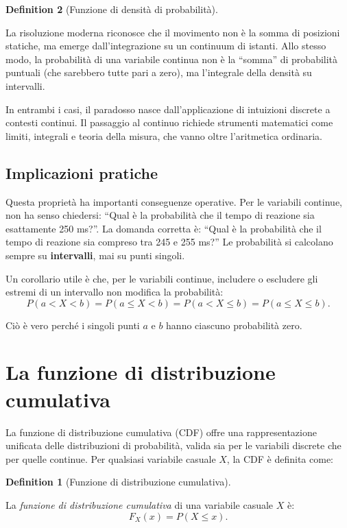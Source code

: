 \documentclass[
  letterpaper,
  DIV=11,
  numbers=noendperiod,
  oneside]{scrreprt}
\theoremstyle{definition}
\theoremstyle{plain}
\theoremstyle{definition}
\newtheorem{definition}{Definition}[chapter]
\theoremstyle{remark}
\begin{document}
\begin{definition}[Funzione di densità di
probabilità]
\begin{tcolorbox}
La risoluzione moderna riconosce che il movimento non è la somma di
posizioni statiche, ma emerge dall'integrazione su un continuum di
istanti. Allo stesso modo, la probabilità di una variabile continua non
è la ``somma'' di probabilità puntuali (che sarebbero tutte pari a
zero), ma l'integrale della densità su intervalli.

In entrambi i casi, il paradosso nasce dall'applicazione di intuizioni
discrete a contesti continui. Il passaggio al continuo richiede
strumenti matematici come limiti, integrali e teoria della misura, che
vanno oltre l'aritmetica ordinaria.

\end{tcolorbox}

\subsection{Implicazioni pratiche}\label{implicazioni-pratiche}

Questa proprietà ha importanti conseguenze operative. Per le variabili
continue, non ha senso chiedersi: ``Qual è la probabilità che il tempo
di reazione sia esattamente 250 ms?''. La domanda corretta è: ``Qual è
la probabilità che il tempo di reazione sia compreso tra 245 e 255 ms?''
Le probabilità si calcolano sempre su \textbf{intervalli}, mai su punti
singoli.

Un corollario utile è che, per le variabili continue, includere o
escludere gli estremi di un intervallo non modifica la probabilità: \[
P(a < X < b) = P(a \leq X < b) = P(a < X \leq b) = P(a \leq X \leq b).
\]

Ciò è vero perché i singoli punti \(a\) e \(b\) hanno ciascuno
probabilità zero.

\section{La funzione di distribuzione
cumulativa}\label{la-funzione-di-distribuzione-cumulativa}

La funzione di distribuzione cumulativa (CDF) offre una rappresentazione
unificata delle distribuzioni di probabilità, valida sia per le
variabili discrete che per quelle continue. Per qualsiasi variabile
casuale \(X\), la CDF è definita come:

\begin{definition}[Funzione di distribuzione
cumulativa]\protect\hypertarget{def-cdf-unified}{}\label{def-cdf-unified}

La \emph{funzione di distribuzione cumulativa} di una variabile casuale
\(X\) è: \[
F_X(x) = P(X \leq x).
\]


\end{definition}
\end{definition}
\end{document}

